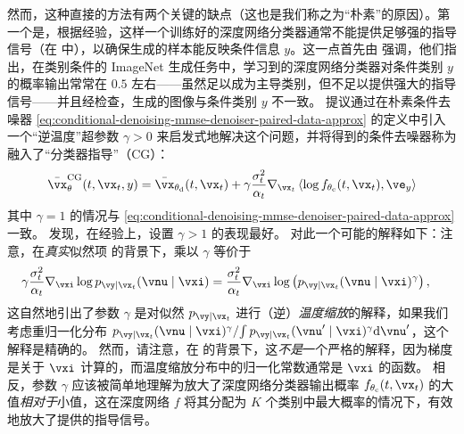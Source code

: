 \documentclass[../../book-main_zh.tex]{subfiles}
\begin{document}
然而，这种直接的方法有两个关键的缺点（这也是我们称之为“朴素”的原因）。第一个是，根据经验，这样一个训练好的深度网络分类器通常不能提供足够强的指导信号（在  中），以确保生成的样本能反映条件信息 $y$。这一点首先由 \citet{Dhariwal2021-hg} 强调，他们指出，在类别条件的 ImageNet 生成任务中，学习到的深度网络分类器对条件类别 $y$ 的概率输出常常在 $0.5$ 左右——虽然足以成为主导类别，但不足以提供强大的指导信号——并且经检查，生成的图像与条件类别 $y$ 不一致。\citet{Dhariwal2021-hg} 提议通过在朴素条件去噪器 \eqref{eq:conditional-denoising-mmse-denoiser-paired-data-approx} 的定义中引入一个“逆温度”超参数 $\gamma > 0$ 来启发式地解决这个问题，并将得到的条件去噪器称为融入了“分类器指导”（CG）：
\begin{equation}\label{eq:conditional-denoising-mmse-denoiser-paired-data-approx-cg}
  \bar{\vx}_{\theta}^{\mathrm{CG}}(t, \vx_t, y)
  =
  \bar{\vx}_{\theta_{\mathrm{d}}}(t, \vx_t)
  + \gamma\frac{\sigma_t^2}{\alpha_t}
  \nabla_{\vx_t}
  \ip*{
    \log f_{\theta_{\mathrm{c}}}(t, \vx_t)
  }{
    \ve_{y}
  }
\end{equation}
其中 $\gamma = 1$ 的情况与 \eqref{eq:conditional-denoising-mmse-denoiser-paired-data-approx} 一致。
\citet{Dhariwal2021-hg} 发现，在经验上，设置 $\gamma > 1$ 的表现最好。
对此一个可能的解释如下：注意，在\textit{真实}似然项  的背景下，乘以 $\gamma$ 等价于
\begin{align}
  \gamma\frac{\sigma_t^2}{\alpha_t} \nabla_{\vxi}\log p_{\vy \mid \vx_t}(\vnu\mid
  \vxi)
  &=
  \frac{\sigma_t^2}{\alpha_t} \nabla_{\vxi}\log \left(
  p_{\vy \mid \vx_t}(\vnu\mid \vxi)^\gamma
  \right), %
\end{align}
这自然地引出了参数 $\gamma$ 是对似然 $p_{\vy \mid \vx_t}$ 进行（逆）\textit{温度缩放}的解释，如果我们考虑重归一化分布 $ { p_{\vy \mid \vx_t}(\vnu\mid \vxi)^\gamma } / { \int p_{\vy \mid \vx_t}(\vnu'\mid \vxi)^\gamma \odif \vnu' } $，这个解释是精确的。
然而，请注意，在  的背景下，这\textit{不是}一个严格的解释，因为梯度是关于 $\vxi$ 计算的，而温度缩放分布中的归一化常数通常是 $\vxi$ 的函数。
相反，参数 $\gamma$ 应该被简单地理解为放大了深度网络分类器输出概率 $f_{\theta_{\mathrm{c}}}(t, \vx_t)$ 的大值\textit{相对于}小值，这在深度网络 $f$ 将其分配为 $K$ 个类别中最大概率的情况下，有效地放大了提供的指导信号。
\end{document}
